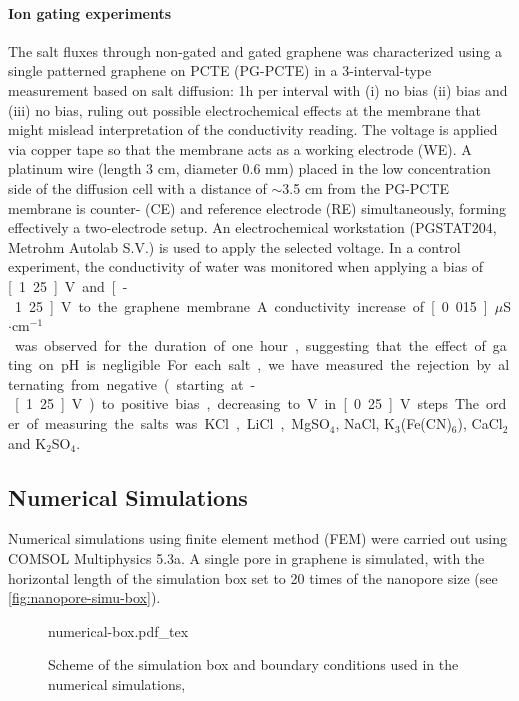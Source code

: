 \paragraph{Ion gating experiments}
{ The salt fluxes through non-gated and gated graphene
was characterized using a single patterned graphene on PCTE (PG-PCTE)} 
in a 3-interval-type measurement based on salt diffusion: 1h per interval
with (i) no bias (ii) bias and (iii) no bias, ruling out possible
electrochemical effects at the membrane that might mislead
interpretation of the conductivity reading. The voltage is applied via
copper tape so that the membrane acts as a working electrode (WE). A
platinum wire (length 3 cm, diameter 0.6 mm) placed in the low
concentration side of the diffusion cell with a distance of $\sim$3.5 cm
from the PG-PCTE membrane is counter- (CE) and reference electrode
(RE) simultaneously, forming effectively a two-electrode setup. An
electrochemical workstation (PGSTAT204, Metrohm Autolab S.V.) is used
to apply the selected voltage.
{ In a control experiment, the conductivity of water was monitored when applying a bias of \unit[1.25]{V} and \unit[-1.25]{V} to the graphene membrane. A conductivity increase of \unit[0.015]{$\mu$S$\cdot$cm$^{-1}$} was observed for the duration of one hour, suggesting that the effect of gating on pH is negligible.

  For each salt, we have measured the rejection by alternating from
  negative (starting at -\unit[1.25]{V}) to positive bias, decreasing
  to \unit[0]{V} in \unit[0.25]{V} steps. The order of measuring the
  salts was KCl, LiCl, MgSO$_4$, NaCl, K$_3$(Fe(CN)$_6$), CaCl$_2$ and
  K$_2$SO$_4$.}

\vspace{1em}
\noindent

\subsection*{Numerical Simulations}
\label{sec:np-numer-simul}

Numerical simulations using finite element method (FEM) were carried
out using COMSOL Multiphysics 5.3a. A single pore in graphene is
simulated, with the horizontal length of the simulation box set to 20
times of the nanopore size (see \autoref{fig:nanopore-simu-box}).
%
\begin{figure}[!htbp]
  \centering
  {numerical-box.pdf_tex}
  \caption{\label{fig:nanopore-simu-box} Scheme of the simulation box
    and boundary conditions used in the numerical simulations,}
\end{figure}

